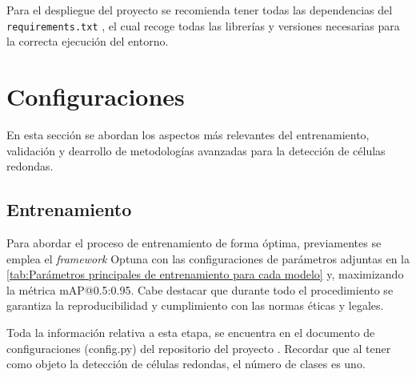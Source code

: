 \documentclass[12pt,a4paper,onecolumn,oneside]{report}
\begin{document}
Para el despliegue del proyecto se recomienda tener todas las dependencias del \texttt{requirements.txt} \cite{repoTFM}, el cual 
recoge todas las librerías y versiones necesarias para la correcta ejecución del entorno.

\section{Configuraciones}
\label{sec:Configuraciones}

En esta sección se abordan los aspectos más relevantes del entrenamiento, validación y dearrollo de metodologías avanzadas para la detección de células redondas.

\subsection{Entrenamiento}
\label{sec:Entrenamiento}

Para abordar el proceso de entrenamiento de forma óptima, previamentes se emplea el \textit{framework} Optuna \cite{Optuna} con las configuraciones de parámetros adjuntas en la \autoref{tab:Parámetros principales de entrenamiento para cada modelo} y,
maximizando la métrica mAP@0.5:0.95. Cabe destacar que durante todo el procedimiento se garantiza la reproducibilidad y cumplimiento con las normas éticas y legales.

Toda la información relativa a esta etapa, se encuentra en el documento de configuraciones (config.py) del repositorio
del proyecto \cite{repoTFM}. Recordar que al tener como objeto la detección de células redondas, el número de clases es uno.
\end{document}
